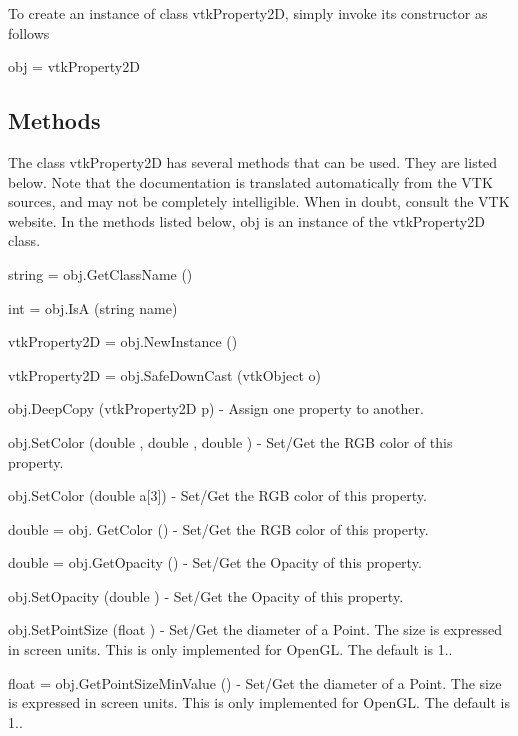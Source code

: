 To create an instance of class vtk\-Property2\-D, simply invoke its constructor as follows \begin{DoxyVerb}  obj = vtkProperty2D
\end{DoxyVerb}
 \hypertarget{vtkwidgets_vtkxyplotwidget_Methods}{}\subsection{Methods}\label{vtkwidgets_vtkxyplotwidget_Methods}
The class vtk\-Property2\-D has several methods that can be used. They are listed below. Note that the documentation is translated automatically from the V\-T\-K sources, and may not be completely intelligible. When in doubt, consult the V\-T\-K website. In the methods listed below, {\ttfamily obj} is an instance of the vtk\-Property2\-D class. 
\begin{DoxyItemize}
\item {\ttfamily string = obj.\-Get\-Class\-Name ()}  
\item {\ttfamily int = obj.\-Is\-A (string name)}  
\item {\ttfamily vtk\-Property2\-D = obj.\-New\-Instance ()}  
\item {\ttfamily vtk\-Property2\-D = obj.\-Safe\-Down\-Cast (vtk\-Object o)}  
\item {\ttfamily obj.\-Deep\-Copy (vtk\-Property2\-D p)} -\/ Assign one property to another.  
\item {\ttfamily obj.\-Set\-Color (double , double , double )} -\/ Set/\-Get the R\-G\-B color of this property.  
\item {\ttfamily obj.\-Set\-Color (double a\mbox{[}3\mbox{]})} -\/ Set/\-Get the R\-G\-B color of this property.  
\item {\ttfamily double = obj. Get\-Color ()} -\/ Set/\-Get the R\-G\-B color of this property.  
\item {\ttfamily double = obj.\-Get\-Opacity ()} -\/ Set/\-Get the Opacity of this property.  
\item {\ttfamily obj.\-Set\-Opacity (double )} -\/ Set/\-Get the Opacity of this property.  
\item {\ttfamily obj.\-Set\-Point\-Size (float )} -\/ Set/\-Get the diameter of a Point. The size is expressed in screen units. This is only implemented for Open\-G\-L. The default is 1..  
\item {\ttfamily float = obj.\-Get\-Point\-Size\-Min\-Value ()} -\/ Set/\-Get the diameter of a Point. The size is expressed in screen units. This is only implemented for Open\-G\-L. The default is 1..  

\end{DoxyItemize}
